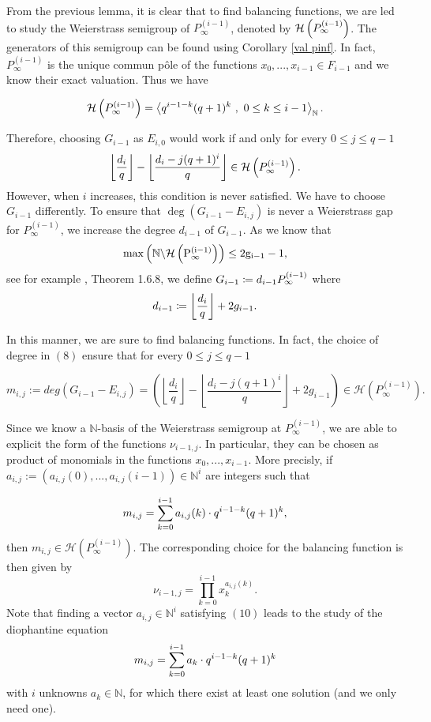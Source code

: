 \documentclass[10pt]{article}
\begin{document}
From the previous lemma, it is clear that to find balancing functions, we are led to study the Weierstrass semigroup of $P^{(i-1)}_{\infty}$, denoted by $\mathcal{H}\left(P^{(i-1)}_{\infty}\right)$. The generators of this semigroup can be found using Corollary \ref{val pinf}. In fact, $P_{\infty}^{(i-1)}$ is the unique commun pôle of the functions $x_0,...,x_{i-1} \in 
F_{i-1}$ and we know their exact valuation. Thus we have

\[\mathcal{H}\left(P^{(i-1)}_{\infty}\right) = \left \langle q^{i-1-k}(q+1)^k \ , \ 0\leq k \leq i-1 \right\rangle_{\mathbb{N}}.\]

Therefore, choosing $G_{i-1}$ as $E_{i,0}$ would work if and only for every $0 \leq j \leq q-1$
\[ \left\lfloor \dfrac{d_i}{q} \right\rfloor - \left\lfloor \dfrac{d_i-j(q+1)^i}{q}\right\rfloor \in \mathcal{H}\left(P^{(i-1)}_{\infty}\right).\]
However, when $i$ increases, this condition is never satisfied. We have to choose $G_{i-1}$ differently.  To ensure that 
$\deg(G_{i-1}-E_{i,j})$ is never a Weierstrass gap for $P_{\infty}^{(i-1)}$, we increase the degree $d_{i-1}$ of $G_{i-1}$. As we know that
\[\rm{max}\left(\mathbb{N} \backslash \mathcal{H}\left(P^{(i-1)}_{\infty}\right)\right) \leq 2g_{i-1} -1,\]
see for example \cite{S08}, Theorem 1.6.8, we define $G_{i-1}\coloneqq d_{i-1} P^{(i-1)}_{\infty}$ where
\begin{equation}\label{eq:deg_herm}
d_{i-1} \coloneqq \left\lfloor \dfrac{d_i}{q}\right\rfloor + 2g_{i-1}.
\end{equation}


In this manner, we are sure to find balancing functions. In fact, the choice of degree in $(8)$ ensure that for every $0 \leq j \leq q-1$ 

\begin{equation}
m_{i,j}:=deg(G_{i-1}-E_{i,j}) =  \left(\left\lfloor \dfrac{d_i}{q} \right\rfloor - \left\lfloor \dfrac{d_i-j(q+1)^i}{q}\right\rfloor + 2g_{i-1} \right) \in \mathcal{H}\left(P_{\infty}^{(i-1)}\right).
\end{equation}

Since we know a $\mathbb{N}$-basis of the Weierstrass semigroup at $P_{\infty}^{(i-1)}$, we are able to explicit the form of the functions $\nu_{i-1,j}$. In particular, they can be chosen as product of monomials in the functions $x_0,...,x_{i-1}$. More precisly, if $a_{i,j} := (a_{i,j}(0),...,a_{i,j}(i-1)) \in \mathbb{N}^i$ are integers such that

\begin{equation}
m_{i,j} = \sum\limits_{k=0}^{i-1} a_{i,j}(k) \cdot q^{i-1-k}(q+1)^k,
\end{equation}
then $m_{i,j} \in \mathcal{H}\left(P_{\infty}^{(i-1)}\right)$. The corresponding choice for the balancing function is then given by 
\[ \nu_{i-1,j} = \prod\limits_{k=0}^{i-1} x_k^{a_{i,j}(k)}.\]
Note that finding a vector $a_{i,j} \in \mathbb{N}^i$ satisfying $(10)$ leads to the study of the diophantine equation
\[m_{i,j} = \sum\limits_{k=0}^{i-1} a_k \cdot q^{i-1-k}(q+1)^k\]
with $i$ unknowns $a_k \in \mathbb{N}$, for which there exist at least one solution (and we only need one).
\end{document}
